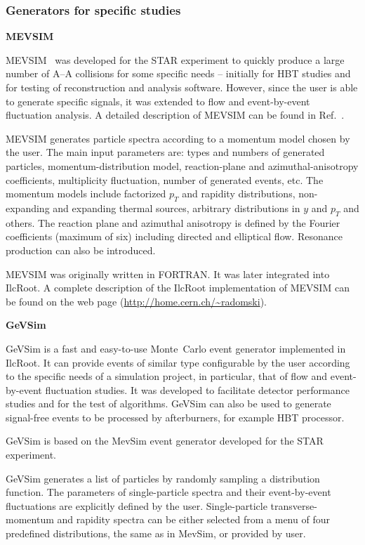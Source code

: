 \documentclass[12pt,a4paper,twoside]{article}
\makeatletter
\newcommand {\MC} {Monte~Carlo\@\xspace}
\makeatother
\begin{document}
\subsubsection{Generators for specific studies}

\textbf{MEVSIM}

MEVSIM~\cite{MC:MEVSIM} was developed for the STAR experiment to
quickly produce a large number of A--A collisions for some
specific needs -- initially for HBT studies and for testing of
reconstruction and analysis software. However, since the user is
able to generate  specific signals, it was extended to flow and
event-by-event fluctuation analysis.  A detailed description of
MEVSIM can be found in Ref.~\cite{MC:MEVSIM}.

MEVSIM generates particle spectra according to a momentum model
chosen by the user. The main input parameters are: types and
numbers of generated particles, momentum-distribution model,
reaction-plane and azimuthal-anisotropy coefficients, multiplicity
fluctuation, number of generated events, etc. The momentum models
include factorized $p_T$ and rapidity distributions, non-expanding
and expanding thermal sources, arbitrary distributions in $y$ and
$p_T$ and others. The reaction plane and azimuthal anisotropy is
defined by the Fourier coefficients (maximum of six) including
directed and elliptical flow. Resonance production can also be
introduced.

MEVSIM was originally written in FORTRAN. It was later integrated into
IlcRoot. A complete description of the IlcRoot implementation of MEVSIM can
be found on the web page (\url{http://home.cern.ch/~radomski}).

\textbf{GeVSim}

GeVSim \cite{MC:GEVSIM} is a fast and easy-to-use \MC
event generator implemented in IlcRoot. It can provide events of
similar type configurable by the user according to the specific
needs of a simulation project, in particular, that of flow and
event-by-event fluctuation studies. It was developed to facilitate
detector performance studies and for the test of algorithms.
GeVSim can also be used to generate signal-free events to be
processed by afterburners, for example HBT processor.

GeVSim is based on the MevSim \cite{MC:MEVSIM} event generator
developed for the STAR experiment. 

GeVSim generates a list of particles by randomly sampling a
distribution function.  The parameters of single-particle spectra
and their event-by-event fluctuations are explicitly defined by
the user. Single-particle transverse-momentum and rapidity spectra
can be either selected from a menu of four predefined
distributions, the same as in MevSim, or provided by user.
\end{document}
